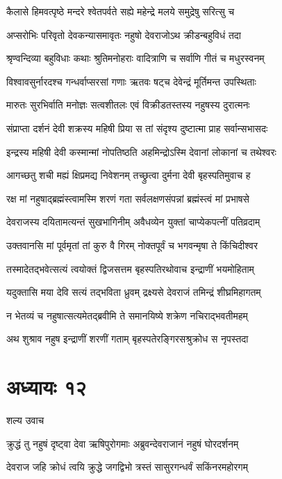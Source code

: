 \twolineshloka
{कैलासे हिमवत्पृष्ठे मन्दरे श्वेतपर्वते}
{सह्ये महेन्द्रे मलये समुद्रेषु सरित्सु च}


\twolineshloka
{अप्सरोभिः परिवृतो देवकन्यासमावृतः}
{नहुषो देवराजोऽथ क्रीडन्बहुविधं तदा}


\twolineshloka
{श्रृण्वन्दिव्या बहुविधाः कथाः श्रुतिमनोहराः}
{वादित्राणि च सर्वाणि गीतं च मधुरस्वनम्}


\twolineshloka
{विश्वावसुर्नारदश्च गन्धर्वाप्सरसां गणाः}
{ऋतवः षट्च देवेन्द्रं मूर्तिमन्त उपस्थिताः}


\twolineshloka
{मारुतः सुरभिर्वाति मनोज्ञः सत्वशीतलः}
{एवं विक्रीडतस्तस्य नहुषस्य दुरात्मनः}


\twolineshloka
{संप्राप्ता दर्शनं देवी शक्रस्य महिषी प्रिया}
{स तां संदृश्य दुष्टात्मा प्राह सर्वान्सभासदः}


\twolineshloka
{इन्द्रस्य महिषी देवी कस्मान्मां नोपतिष्ठति}
{अहमिन्द्रोऽस्मि देवानां लोकानां च तथेश्वरः}


\twolineshloka
{आगच्छतु शची मह्यं क्षिप्रमद्य निवेशनम्}
{तच्छ्रुत्वा दुर्मना देवी बृहस्पतिमुवाच ह}


\twolineshloka
{रक्ष मां नहुषाद्ब्रह्मंस्त्वामस्मि शरणं गता}
{सर्वलक्षणसंपन्नां ब्रह्मंस्त्वं मां प्रभाषसे}


\twolineshloka
{देवराजस्य दयितामत्यन्तं सुखभागिनीम्}
{अवैधव्येन युक्तां चाप्येकपत्नीं पतिव्रदाम्}


\twolineshloka
{उक्तवानसि मां पूर्वमृतां तां कुरु वै गिरम्}
{नोक्तपूर्वं च भगवन्मृषा ते किंचिदीश्वर}


\twolineshloka
{तस्मादेतद्भवेत्सत्यं त्वयोक्तं द्विजसत्तम}
{बृहस्पतिरथोवाच इन्द्राणीं भयमोहिताम्}


\twolineshloka
{यदुक्तासि मया देवि सत्यं तद्भविता ध्रुवम्}
{द्रक्ष्यसे देवराजं तमिन्द्रं शीघ्रमिहागतम्}


\twolineshloka
{न भेतव्यं च नहुषात्सत्यमेतद्ब्रवीमि ते}
{समानयिष्ये शक्रेण नचिराद्भवतीमहम्}


\twolineshloka
{अथ शुश्राव नहुष इन्द्राणीं शरणीं गताम्}
{बृहस्पतेरङ्गिरसश्रुक्रोध स नृपस्तदा}


\chapter{अध्यायः १२}
\twolineshloka
{शल्य उवाच}
{}


\twolineshloka
{क्रुद्धं तु नहुषं दृष्ट्वा देवा ऋषिपुरोगमाः}
{अब्रुवन्देवराजानं नहुषं घोरदर्शनम्}


\twolineshloka
{देवराज जहि क्रोधं त्वयि क्रुद्धे जगद्विभो}
{त्रस्तं सासुरगन्धर्वं सकिंनरमहोरगम्}


